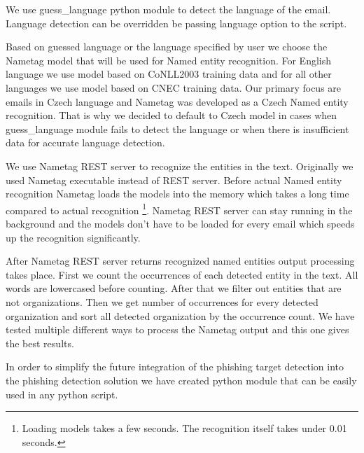 \documentclass[thesis=B,english]{FITthesis}[2012/10/20]
\begin{document}
\par We use guess\_language python module \cite{guess_language} to detect the language of the email. Language detection can be overridden be passing language option to the script.

\par Based on guessed language or the language specified by user we choose the Nametag model that will be used for Named entity recognition. For English language we use model based on CoNLL2003 training data and for all other languages we use model based on CNEC training data. Our primary focus are emails in Czech language and Nametag was developed as a Czech Named entity recognition. That is why we decided to default to Czech model in cases when guess\_language module fails to detect the language or when there is insufficient data for accurate language detection.
\par We use Nametag REST server to recognize the entities in the text. Originally we used Nametag executable instead of REST server. Before actual Named entity recognition Nametag loads the models into the memory which takes a long time compared to actual recognition \footnote{Loading models takes a few seconds. The recognition itself takes under 0.01 seconds.}. Nametag REST server can stay running in the background and the models don't have to be loaded for every email which speeds up the recognition significantly. 
\par After Nametag REST server returns recognized named entities output processing takes place. First we count the occurrences of each detected entity in the text. All words are lowercased before counting. After that we filter out entities that are not organizations. Then we get number of occurrences for every detected organization and sort all detected organization by the occurrence count. We have tested multiple different ways to process the Nametag output and this one gives the best results. 
\par In order to simplify the future integration of the phishing target detection into the phishing detection solution we have created python module that can be easily used in any python script.   
\end{document}
